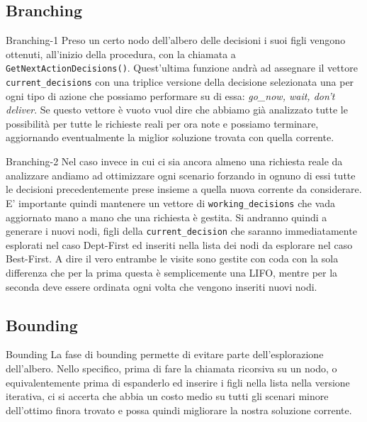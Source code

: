 \documentclass[10pt]{beamer}
\begin{document}
    \subsection{Branching}\label{sec:branching}
    \begin{frame}{Branching-1}
        Preso un certo nodo dell'albero delle decisioni i suoi figli vengono ottenuti, all'inizio della procedura, con la chiamata a \texttt{GetNextActionDecisions()}. Quest'ultima funzione andrà ad assegnare il vettore \texttt{current\_decisions} con una triplice versione della decisione selezionata una per ogni tipo di azione che possiamo performare su di essa: \textit{go\_now, wait, don't deliver}. Se questo vettore è vuoto vuol dire che abbiamo già analizzato tutte le possibilità per tutte le richieste reali per ora note e possiamo terminare, aggiornando eventualmente la miglior soluzione trovata con quella corrente. 
    \end{frame}

    \begin{frame}{Branching-2}
        Nel caso invece in cui ci sia ancora almeno una richiesta reale da analizzare andiamo ad ottimizzare ogni scenario forzando in ognuno di essi tutte le decisioni precedentemente prese insieme a quella nuova corrente da considerare. E' importante quindi mantenere un vettore di \texttt{working\_decisions} che vada aggiornato mano a mano che una richiesta è gestita. Si andranno quindi a generare i nuovi nodi, figli della \texttt{current\_decision} che saranno immediatamente esplorati nel caso Dept-First ed inseriti nella lista dei nodi da esplorare nel caso Best-First. A dire il vero entrambe le visite sono gestite con coda con la sola differenza che per la prima questa è semplicemente una LIFO, mentre per la seconda deve essere ordinata ogni volta che vengono inseriti nuovi nodi.
    \end{frame}

    \subsection{Bounding}\label{sec:bounding}
    \begin{frame}{Bounding}
        La fase di bounding permette di evitare parte dell'esplorazione dell'albero. Nello specifico, prima di fare la chiamata ricorsiva su un nodo, o equivalentemente prima di espanderlo ed inserire i figli nella lista nella versione iterativa, ci si accerta che abbia un costo medio su tutti gli scenari minore dell'ottimo finora trovato e possa quindi migliorare la nostra soluzione corrente.
    \end{frame}
\end{document}

